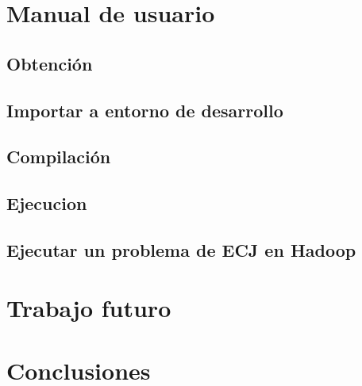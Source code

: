\documentclass{estilos-y-libreria}
\begin{document}
\chapter{Manual de usuario}
	\section{Obtenci\'on}
		
	\section{Importar a entorno de desarrollo}
		
	\section{Compilaci\'on}
		
	\section{Ejecucion}\label{ejecucion}
		
	\section{Ejecutar un problema de ECJ en Hadoop}
		

\chapter{Trabajo futuro}
	
	
\chapter{Conclusiones}
	

\end{document}
